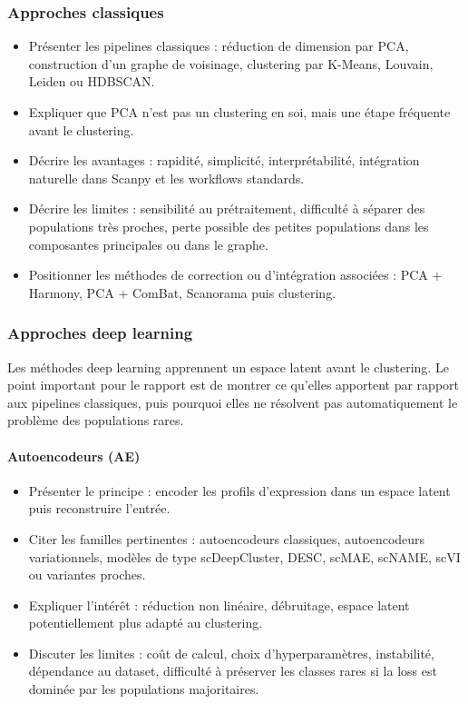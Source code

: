 \subsubsection{Approches classiques}
\begin{itemize}
  \item Présenter les pipelines classiques : réduction de dimension par PCA, construction d'un graphe de voisinage, clustering par K-Means, Louvain, Leiden ou HDBSCAN.
  \item Expliquer que PCA n'est pas un clustering en soi, mais une étape fréquente avant le clustering.
  \item Décrire les avantages : rapidité, simplicité, interprétabilité, intégration naturelle dans Scanpy et les workflows standards.
  \item Décrire les limites : sensibilité au prétraitement, difficulté à séparer des populations très proches, perte possible des petites populations dans les composantes principales ou dans le graphe.
  \item Positionner les méthodes de correction ou d'intégration associées : PCA + Harmony, PCA + ComBat, Scanorama puis clustering.
\end{itemize}

\subsubsection{Approches deep learning}
Les méthodes deep learning apprennent un espace latent avant le clustering. Le point important pour le rapport est de montrer ce qu'elles apportent par rapport aux pipelines classiques, puis pourquoi elles ne résolvent pas automatiquement le problème des populations rares.

\paragraph{Autoencodeurs (AE)}
\begin{itemize}
  \item Présenter le principe : encoder les profils d'expression dans un espace latent puis reconstruire l'entrée.
  \item Citer les familles pertinentes : autoencodeurs classiques, autoencodeurs variationnels, modèles de type scDeepCluster, DESC, scMAE, scNAME, scVI ou variantes proches.
  \item Expliquer l'intérêt : réduction non linéaire, débruitage, espace latent potentiellement plus adapté au clustering.
  \item Discuter les limites : coût de calcul, choix d'hyperparamètres, instabilité, dépendance au dataset, difficulté à préserver les classes rares si la loss est dominée par les populations majoritaires.
\end{itemize}

